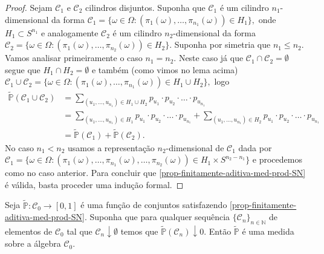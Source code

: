 \begin{proof}
Sejam $\mathcal{C}_1$ e $\mathcal{C}_2$ cilindros 
disjuntos. Suponha que $\mathcal{C}_1$ é 
um cilindro $n_1$-dimensional da forma
$
\mathcal{C}_1 
=
\{
\omega\in \Omega:
(\pi_1(\omega), \ldots,\pi_{n_1}(\omega)) 
\in H_1 
\},
$
onde $H_1\subset S^{n_1}$ e analogamente
$\mathcal{C}_2$ é um cilindro $n_2$-dimensional
da forma
$
\mathcal{C}_2 
=
\{
\omega\in \Omega:
(\pi_1(\omega), \ldots,\pi_{n_2}(\omega)) 
\in H_2 
\}.
$
Suponha por simetria que $n_1\leq n_2$. 
Vamos analisar primeiramente o caso $n_1=n_2$.
Neste caso já que $\mathcal{C}_1\cap\mathcal{C}_2=\emptyset$ 
segue que $H_1\cap H_2=\emptyset$ e também
(como vimos no lema acima) 
$
\mathcal{C}_1\cup \mathcal{C}_2
=
\{
\omega\in \Omega:
(\pi_1(\omega), \ldots,\pi_{n_1}(\omega)) 
\in H_1\cup H_2 
\},
$
logo 
\begin{align*}
\widetilde{\mathbb{P}}(\mathcal{C}_1\cup \mathcal{C}_2)
&=
\sum_{(u_1,\ldots,u_{n_1})\in H_1\cup H_2} 
p_{u_1}\cdot p_{u_2}\cdot\ldots\cdot p_{u_{n_1}}
\\[0.3cm]
&=
\sum_{(u_1,\ldots,u_{n_1})\in H_1} 
p_{u_1}\cdot p_{u_2}\cdot\ldots\cdot p_{u_{n_1}}
+
\sum_{(u_1,\ldots,u_{n_1})\in H_2} 
p_{u_1}\cdot p_{u_2}\cdot\ldots\cdot p_{u_{n_1}}
\\[0.3cm]
&=
\widetilde{\mathbb{P}}(\mathcal{C}_1)
+
\widetilde{\mathbb{P}}(\mathcal{C}_2).
\end{align*}
No caso $n_1<n_2$ usamos a representação $n_2$-dimensional
de $\mathcal{C}_1$ dada por 
$
\mathcal{C}_1
=
\{
\omega\in \Omega:
(\pi_1(\omega), \ldots,\pi_{n_1}(\omega),\ldots,\pi_{n_2}(\omega)) 
\in H_1\times S^{n_2-n_1} 
\}
$
e procedemos como no caso anterior. Para concluir que 
\eqref{prop-finitamente-aditiva-med-prod-SN}
é válida, basta proceder uma indução formal.
\end{proof}


\begin{lema}\label{lema-medida-fin-adit-implica-sigma-fin-adit}
Seja $\widetilde{\mathbb{P}}:\mathscr{C}_0\to [0,1]$
é uma função de conjuntos satisfazendo 
\eqref{prop-finitamente-aditiva-med-prod-SN}.
Suponha que para qualquer sequência 
$\{\mathcal{C}_n\}_{n\in\mathbb{N}}$ de elementos de 
$\mathscr{C}_0$ tal que $\mathcal{C}_n\downarrow \emptyset$
temos que $\widetilde{\mathbb{P}}(\mathcal{C}_n)\downarrow 0$.
Então $\widetilde{\mathbb{P}}$ é uma medida sobre a 
álgebra $\mathscr{C}_0$.
\end{lema}

